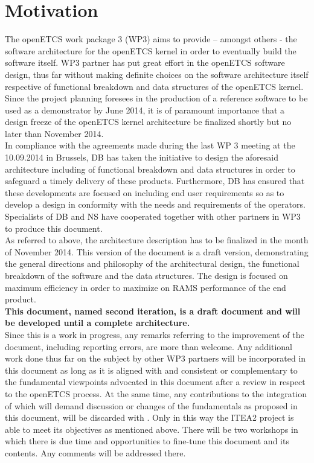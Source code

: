 \documentclass{template/openetcs_report}
\begin{document}
\section{Motivation}
The openETCS work package 3 (WP3) aims to provide – amongst others - the software architecture for the openETCS kernel in order to eventually build the software itself. WP3  partner has put great effort in the openETCS software design, thus far without making definite choices on the software architecture itself respective of functional breakdown and data structures of the openETCS kernel. Since the project planning foresees in the production of a reference software to be used as a demonstrator by June 2014, it is of paramount importance that a design freeze of the openETCS kernel architecture be finalized shortly but no later than November 2014.\\

In compliance with the agreements made during the last WP 3 meeting at the 10.09.2014 in Brussels, DB has taken the initiative to design the aforesaid architecture including of functional breakdown and data structures in order to safeguard a timely delivery of these products. Furthermore, DB has ensured that these developments are focused on including end user requirements so as to develop a design in conformity with the needs and requirements of the operators. Specialists of DB and NS have cooperated together with other partners in WP3 to produce this document.\\

As referred to above, the architecture description has to be finalized in the month of November 2014. This version of the document is a draft version, demonstrating the general directions and philosophy of the architectural design, the functional breakdown of the software and the data structures. The design is focused on maximum efficiency in order to maximize on RAMS performance of the end product.\\

\textbf{This document, named second iteration, is a draft document and will be developed until a complete architecture.}\\

Since this is a work in progress, any remarks referring to the improvement of the document, including reporting errors, are more than welcome. Any additional work done thus far on the subject by other WP3 partners will be incorporated in this document as long as it is aligned with and consistent or complementary  to the fundamental viewpoints advocated in this document after a review in respect to the openETCS process. At the same time, any contributions to the  integration of which will demand discussion or changes of the fundamentals as proposed in this document, will be discarded with . Only in this way the ITEA2 project is able to meet its objectives as mentioned above. There will be two workshops in which there is due time and opportunities to fine-tune this document and its contents. Any comments will be addressed there.\\
\end{document}
